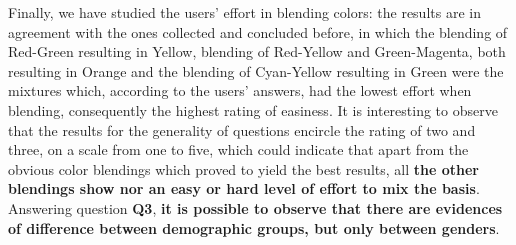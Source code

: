 %
Finally, we have studied the users' effort in blending colors: the results are in agreement with the ones collected and concluded before, in which the blending of Red-Green resulting in Yellow, blending of Red-Yellow and Green-Magenta, both resulting in Orange and the
blending of Cyan-Yellow resulting in Green were the mixtures which, according to the users’ answers, had the lowest effort when blending, consequently the highest rating of easiness. It is interesting to observe that the results for the generality of questions encircle
the rating of two and three, on a scale from one to five, which could indicate that apart from the obvious color blendings which proved to yield the best results, all \textbf{the other blendings show nor an easy or hard level of effort to mix the basis}. Answering question
\textbf{Q3}, \textbf{it is possible to observe that there are evidences of difference between demographic groups, but only between genders}.
%
